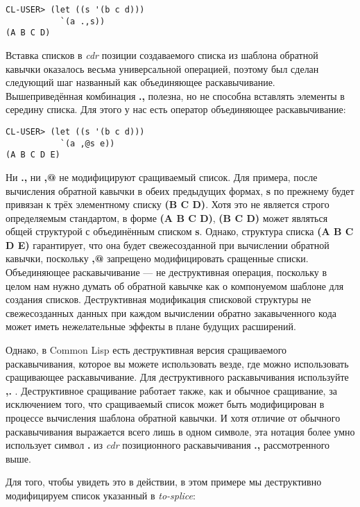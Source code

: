 \begin{verbatim}
CL-USER> (let ((s '(b c d)))
           `(a .,s))
(A B C D)
\end{verbatim}

Вставка списков в \emph{cdr} позиции создаваемого списка из шаблона обратной кавычки оказалось весьма универсальной операцией, поэтому был сделан следующий шаг названный как объединяющее раскавычивание. Вышеприведённая комбинация \textbf{.,} полезна, но не способна вставлять элементы в середину списка. Для этого у нас есть оператор объединяющее раскавычивание:

\begin{verbatim}
CL-USER> (let ((s '(b c d)))
           `(a ,@s e))
(A B C D E)
\end{verbatim}

Ни \textbf{.,} ни \textbf{,@} не модифицируют сращиваемый список. Для примера, после вычисления обратной кавычки в обеих предыдущих формах, \textbf{s} по прежнему будет привязан к трёх элементному списку \textbf{(B C D)}. Хотя это не является строго определяемым стандартом, в форме \textbf{(A B C D)}, \textbf{(B C D)} может являться общей структурой с объединённым списком \textbf{s}. Однако, структура списка \textbf{(A B C D E)} гарантирует, что она будет свежесозданной при вычислении обратной кавычки, поскольку \textbf{,@} запрещено модифицировать сращенные списки. Объединяющее раскавычивание --- не деструктивная операция, поскольку в целом нам нужно думать об обратной кавычке как о компонуемом шаблоне для создания списков. Деструктивная модификация списковой структуры не свежесозданных данных при каждом вычислении обратно закавыченного кода может иметь нежелательные эффекты в плане будущих расширений.

Однако, в Common Lisp есть деструктивная версия сращиваемого раскавычивания, которое вы можете использовать везде, где можно использовать сращивающее раскавычивание. Для деструктивного раскавычивания используйте \textbf{,.} . Деструктивное сращивание работает также, как и обычное сращивание, за исключением того, что сращиваемый список может быть модифицирован в процессе вычисления шаблона обратной кавычки. И хотя отличие от обычного раскавычивания выражается всего лишь в одном символе, эта нотация более умно использует символ \textbf{.} из \emph{cdr} позиционного раскавычивания \textbf{.,} рассмотренного выше.

Для того, чтобы увидеть это в действии, в этом примере мы деструктивно модифицируем список указанный в \emph{to-splice}:

